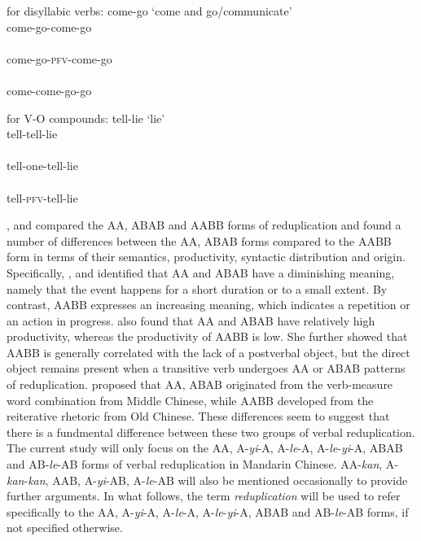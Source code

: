 \ex\label{ex:forms-di} for disyllabic verbs:  come-go `come and go/communicate'
		\ea \gll {}\\
		come-go-come-go\\ 
		\ex \gll {}\\
		come-go-\textsc{pfv}-come-go\\ 
		\ex \gll {}\\
		come-come-go-go\\ 
		\z

\ex\label{ex:forms-vo} for V-O compounds:  tell-lie `lie'
		\ea \gll {}\\
		tell-tell-lie\\ 
		\ex \gll {}\\
		tell-one-tell-lie\\ 
		\ex \gll {}\\
		tell-\textsc{pfv}-tell-lie\\ 
		\z
\z




 \citet{Fan1964}, \citet{Arcodiaetal2014}  and \citet{Xie2020} compared the AA, ABAB and AABB forms of reduplication 
and found a number of differences between the AA, ABAB forms compared to the AABB form in terms of their semantics, productivity, syntactic distribution and origin. 
Specifically, \citet[17--18]{Arcodiaetal2014}, \citet[144]{MelloniBasciano2018} and \citet[90]{Xie2020} identified that AA and ABAB have a diminishing meaning, 
namely that the event happens for a short duration or to a small extent. 
By contrast, AABB expresses an increasing meaning, which indicates a repetition or an action in progress. 
\citet[Sec. 3.1]{Xie2020} also found that AA and ABAB have relatively high productivity, 
whereas the productivity of AABB is low. 
She further showed that AABB is generally correlated with the lack of a postverbal object, but the direct object remains present when a transitive verb undergoes AA or ABAB patterns of reduplication. 
\citet[277]{Fan1964} proposed that AA, ABAB originated from the verb-measure word combination from Middle Chinese, 
while AABB developed from the reiterative rhetoric from Old Chinese. 
These differences seem to suggest that there is a fundmental difference between these two groups of verbal reduplication. 
The current study will only focus on the AA, A-\textit{yi}-A, A-\textit{le}-A, A-\textit{le}-\textit{yi}-A, ABAB and AB-\textit{le}-AB forms of verbal reduplication in Mandarin Chinese.
AA-\textit{kan}, A-\textit{kan}-\textit{kan}, AAB, A-\textit{yi}-AB, A-\textit{le}-AB will also be mentioned occasionally to provide further arguments.
In what follows, the term \textit{reduplication} will be used  to refer specifically to the AA, A\hyp{}\textit{yi}\hyp{}A, A-\textit{le}-A, A-\textit{le}-\textit{yi}-A, ABAB and AB-\textit{le}-AB forms, if not specified otherwise.




